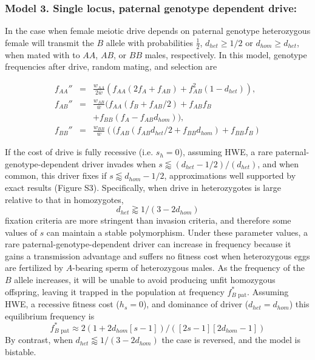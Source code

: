 \documentclass{pnastwo}
\begin{document}
\begin{article}
\subsubsection{Model 3. Single locus, paternal genotype dependent drive:}
In the case when female meiotic drive depends on paternal genotype
 heterozygous female will transmit the $B$ allele 
  with probabilities  $\frac{1}{2}$,  $d_{het}\geq 1/2 $ or $d_{hom}\geq d_{het}$, 
 when mated with to $AA$, $AB$, or $BB$ males,  respectively. 
  In this model, genotype frequencies after drive, random mating, and selection are 
  
\begin{eqnarray*}
f_{AA}''&=&\frac{w_{AA}}{2\bar{w}}\left( f_{AA} (2 f_A + f_{AB} ) + f_{AB}^2 (1 - d_{het}) \right),\\
f_{AB}''&=&\frac{w_{AB}}{\bar{w}}\big(f_{AA} (f_B + f_{AB}/2) +  f_{AB} f_B \\&& + f_{BB}(f_A - f_{AB} d_{hom})\big),\\
f_{BB}''&=&\frac{w_{BB}}{\bar{w}}\left((f_{AB} (f_{AB} d_{het}/2 + f_{BB} d_{hom}) + f_{BB} f_B\right)
\end{eqnarray*}



If the cost of drive is fully recessive (i.e. $s_h=0$), assuming HWE, 
	a rare paternal-genotype-dependent driver invades when 
	$s\lessapprox (d_{het}-1/2)/(d_{het})$, and when common, this driver fixes if 
	$s\lessapprox d_{hom}-1/2$, approximations well supported by exact results (Figure S3).
Specifically, when drive in heterozygotes is large relative to that in homozygotes, 
	\begin{equation} d_{het}  \gtrapprox 1/(3-2d_{hom}) \label{polymale} \end{equation}
	fixation criteria are more stringent than invasion criteria, 
	and therefore some values of $s$ can maintain a stable polymorphism. 
Under these parameter values, a rare paternal-genotype-dependent driver 
	can increase in frequency because it gains a transmission advantage and suffers 
	no fitness cost when heterozygous eggs are fertilized by 
	$A$-bearing sperm of heterozygous males. 
As the frequency of the $B$ allele increases, 
	it will be unable to 
	avoid producing unfit homozygous offspring, leaving it trapped in
	the population at frequency $f_{B\text{ pat}}^*$. 
Assuming HWE, a recessive fitness cost ($h_s=0$), and dominance of driver ($d_{het}=d_{hom}$) this equilibrium frequency is
\begin{equation}f_{B\text{ pat}}^*\approx2 (1 + 2d_{hom}[s - 1])/([2 s - 1][2d_{hom}- 1]) \label{eqmale} \end{equation}
By contrast, when $d_{het} \lessapprox 1/(3-2d_{hom})$ the case is reversed, and the model is bistable.
 

\end{article}
\end{document}
